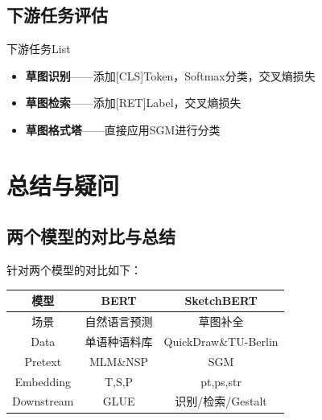 \documentclass[UTF-8,fontset = none]{ctexbeamer}
\begin{document}
\subsection{下游任务评估}
\begin{frame}{下游任务List}
    \begin{figure}[htpb]
        \begin{center}
        \end{center}
    \end{figure}
    \begin{itemize}[<+-| alert@+>] %
        \item \textbf{草图识别}——添加[CLS]Token，Softmax分类，交叉熵损失
        \item \textbf{草图检索}——添加[RET]Label，交叉熵损失
        \item \textbf{草图格式塔}——直接应用SGM进行分类
    \end{itemize}
\end{frame}

\section{总结与疑问}

\subsection{两个模型的对比与总结}
\begin{frame}
    针对两个模型的对比如下：
    \begin{table}[h]
        \centering
        \begin{tabular}{c|cc}
            模型 & BERT & SketchBERT \\ \hline
            场景 & 自然语言预测 & 草图补全 \\
            Data & 单语种语料库 & QuickDraw\&TU-Berlin \\
            Pretext & MLM\&NSP & SGM \\
            Embedding & T,S,P & pt,ps,str\\
            Downstream & GLUE & 识别/检索/Gestalt \\
        \end{tabular}
    \end{table}
\end{frame}
\end{document}
